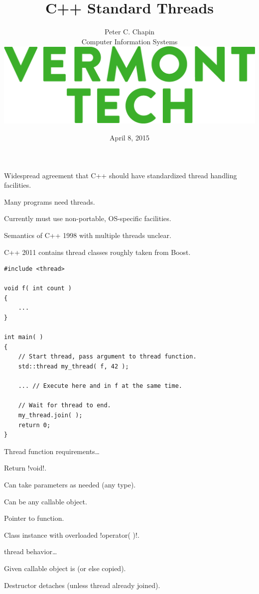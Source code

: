\documentclass[landscape]{slides}
\title{\color{titlecolor}C++ Standard Threads}
\author{
  \begin{tabular}{c}
  \\[3mm]
  \Large{Peter C. Chapin} \\[2mm]
  \normalsize{Computer Information Systems}\\[5mm]
  \includegraphics[scale=0.80]{Vermont-Tech-Stack.jpg}\\[16mm]
  \end{tabular}
}
\date{April 8, 2015}
\begin{document}
\color{Black}
\pagecolor{Background}

\maketitle


\begin{citemize}
\item {} Widespread agreement that C++ should have standardized thread handling
  facilities.
\begin{citemize}
  \item Many programs need threads.
  \item Currently must use non-portable, OS-specific facilities.
  \item Semantics of C++ 1998 with multiple threads unclear.
  \item C++ 2011 contains thread classes roughly taken from Boost.
\end{citemize}
\end{citemize}
\stopslide


{\small
\begin{lstlisting}
#include <thread>

void f( int count )
{
    ...
}

int main( )
{
    // Start thread, pass argument to thread function.
    std::thread my_thread( f, 42 );

    ... // Execute here and in f at the same time.

    // Wait for thread to end.
    my_thread.join( );
    return 0;
}
\end{lstlisting}
}
\stopslide


\begin{citemize}
  \item Thread function requirements\ldots
  \begin{citemize}
    \item Return !void!.
    \item Can take parameters as needed (any type).
    \item Can be any callable object.
      \begin{citemize}
        \item Pointer to function.
        \item Class instance with overloaded !operator( )!.
      \end{citemize}
  \end{citemize}

  \item thread behavior\ldots
    \begin{citemize}
      \item Given callable object is  (or else copied).
      \item Destructor detaches (unless thread already joined).
    \end{citemize}
\end{citemize}
\stopslide
\end{document}
